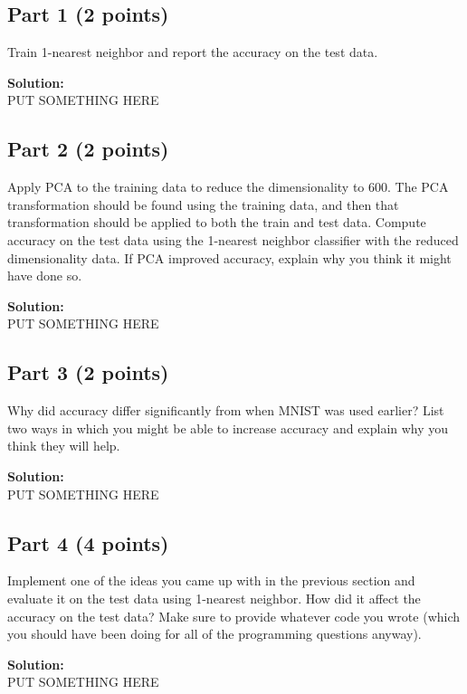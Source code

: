 \documentclass[11pt, oneside]{article}   	%
\begin{document}
\subsection*{Part 1 (2 points)}
Train 1-nearest neighbor and report the accuracy on the test data. 

\textbf{Solution:}\\
PUT SOMETHING HERE 

\subsection*{Part 2 (2 points)}
Apply PCA to the training data to reduce the dimensionality to 600. The PCA transformation should be found using the training data, and then that transformation should be applied to both the train and test data. Compute accuracy on the test data using the 1-nearest neighbor classifier with the reduced dimensionality data. If PCA improved accuracy, explain why you think it might have done so.

\textbf{Solution:}\\
PUT SOMETHING HERE 

\subsection*{Part 3 (2 points)}
Why did accuracy differ significantly from when MNIST was used earlier? List two ways in which you might be able to increase accuracy and explain why you think they will help.

\textbf{Solution:}\\
PUT SOMETHING HERE 

\subsection*{Part 4 (4 points)}
Implement one of the ideas you came up with in the previous section and evaluate it on the test data using 1-nearest neighbor. How did it affect the accuracy on the test data? Make sure to provide whatever code you wrote (which you should have been doing for all of the programming questions anyway).

\textbf{Solution:}\\
PUT SOMETHING HERE 
\end{document}
